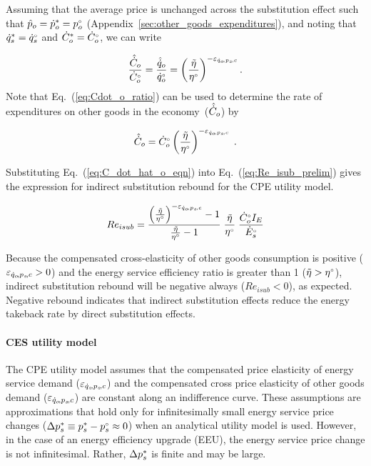 Assuming that the average price is unchanged across the substitution effect
such that $\hat{p}_o = {\dot{p}}^*_o = {}{p}^{\scriptscriptstyle \circ}_o$
(Appendix~\ref{sec:other_goods_expenditures}),
and noting that ${\dot{q}}^*_s = {}{\dot{q}}^{\scriptscriptstyle \circ}_s$ and ${\dot{C}}^*_o = {}{\dot{C}}^{\scriptscriptstyle \circ}_o$,
we can write

\begin{equation} \label{eq:Cdot_o_ratio}
  \frac{\hat{\dot{C}}_o}{{}{\dot{C}}^{\scriptscriptstyle \circ}_o}
      = \frac{\hat{\dot{q}}_o}{{}{\dot{q}}^{\scriptscriptstyle \circ}_o}
      = \left( \frac{\tilde{\eta}}{{}{\eta}^{\scriptscriptstyle \circ}} \right)^{-\varepsilon_{\dot{q}_o\!,p_s\!,c}} .
\end{equation}
%
Note that Eq.~(\ref{eq:Cdot_o_ratio})
can be used to determine the rate of expenditures
on other goods in the economy~($\hat{\dot{C}}_o$) by

\begin{equation} \label{eq:C_dot_hat_o_eqn}
  \hat{\dot{C}}_o = {}{\dot{C}}^{\scriptscriptstyle \circ}_o \left( \frac{\tilde{\eta}}{{}{\eta}^{\scriptscriptstyle \circ}} \right)^{-\varepsilon_{\dot{q}_o\!,p_s\!,c}} \; .
\end{equation}

Substituting Eq.~(\ref{eq:C_dot_hat_o_eqn}) into Eq.~(\ref{eq:Re_isub_prelim})
gives the expression for 
indirect substitution rebound for the CPE utility model.

\begin{equation}
  Re_{isub} = \frac{{\left( \frac{\tilde{\eta}}{{}{\eta}^{\scriptscriptstyle \circ}} \right)} ^{-\varepsilon_{\dot{q}_o\!,p_s\!,c}} - 1}{\frac{\tilde{\eta}}{{}{\eta}^{\scriptscriptstyle \circ}} - 1} \; \frac{\tilde{\eta}}{{}{\eta}^{\scriptscriptstyle \circ}} \; \frac{{}{\dot{C}}^{\scriptscriptstyle \circ}_o I_E}{{}{\dot{E}}^{\scriptscriptstyle \circ}_s}{}
\end{equation}

Because the compensated cross-elasticity of other goods consumption is positive ($\varepsilon_{\dot{q}_o\!,p_s\!,c} > 0$) and
the energy service efficiency ratio is greater than 1 ($\tilde{\eta} > {}{\eta}^{\scriptscriptstyle \circ}$),
indirect substitution rebound will be negative always ($Re_{isub} < 0$),
as expected.
Negative rebound indicates that indirect substitution effects 
reduce the energy takeback rate by direct substitution effects.


\paragraph{CES utility model}
\label{sec:Resub_exact_method}

The CPE utility model assumes that 
the compensated price elasticity of energy service demand ($\varepsilon_{\dot{q}_s\!,p_s\!,c}$) and
the compensated cross price elasticity of other goods demand ($\varepsilon_{\dot{q}_o\!,p_s\!,c}$)
are constant along an indifference curve.
These assumptions are approximations that hold only 
for infinitesimally small energy service price changes
($\Delta {p}^*_s \equiv {p}^*_s - {}{p}^{\scriptscriptstyle \circ}_s \approx 0$)
when an analytical utility model is used.
However, in the case of an energy efficiency upgrade (EEU), 
the energy service price change is not infinitesimal.
Rather, 
$\Delta {p}^*_s$ is finite and may be large.

